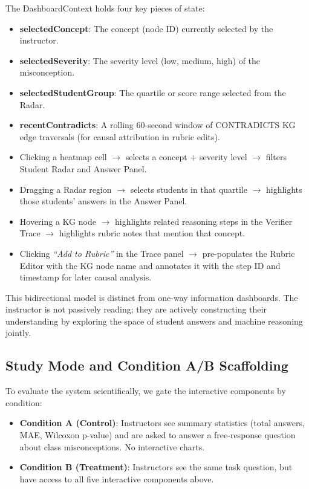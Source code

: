 \documentclass[journal,review]{vgtc}
\begin{document}
The DashboardContext holds four key pieces of state:
\begin{itemize}
  \item \textbf{selectedConcept}: The concept (node ID) currently selected by the instructor.
  \item \textbf{selectedSeverity}: The severity level (low, medium, high) of the misconception.
  \item \textbf{selectedStudentGroup}: The quartile or score range selected from the Radar.
  \item \textbf{recentContradicts}: A rolling 60-second window of CONTRADICTS KG edge traversals (for causal attribution in rubric edits).
\end{itemize}

\begin{itemize}
  \item Clicking a heatmap cell $\rightarrow$ selects a concept + severity level $\rightarrow$ filters Student Radar and Answer Panel.
  \item Dragging a Radar region $\rightarrow$ selects students in that quartile $\rightarrow$ highlights those students' answers in the Answer Panel.
  \item Hovering a KG node $\rightarrow$ highlights related reasoning steps in the Verifier Trace $\rightarrow$ highlights rubric notes that mention that concept.
  \item Clicking \textit{``Add to Rubric''} in the Trace panel $\rightarrow$ pre-populates the Rubric Editor with the KG node name and annotates it with the step ID and timestamp for later causal analysis.
\end{itemize}

This bidirectional model is distinct from one-way information dashboards. The instructor is not passively reading; they are actively constructing their understanding by exploring the space of student answers and machine reasoning jointly.

\subsection{Study Mode and Condition A/B Scaffolding}

To evaluate the system scientifically, we gate the interactive components by condition:

\begin{itemize}
  \item \textbf{Condition A (Control)}: Instructors see summary statistics (total answers, MAE, Wilcoxon p-value) and are asked to answer a free-response question about class misconceptions. No interactive charts.

  \item \textbf{Condition B (Treatment)}: Instructors see the same task question, but have access to all five interactive components above.
\end{itemize}
\end{document}
